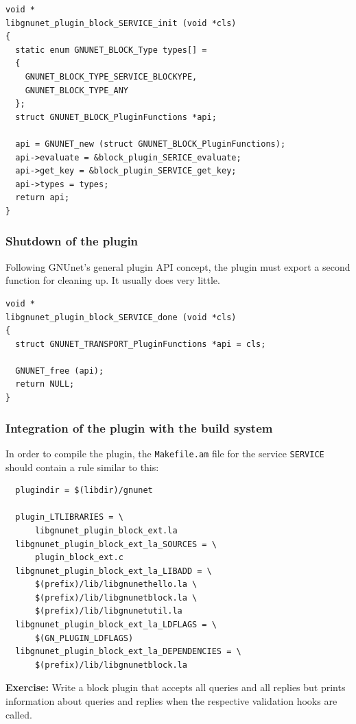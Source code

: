 \documentclass[10pt]{article}
\newcommand{\exercise}[1]{\noindent\begin{boxedminipage}{\textwidth}{\bf Exercise:} #1 \end{boxedminipage}}
\begin{document}
\lstset{language=C}
\begin{lstlisting}
void *
libgnunet_plugin_block_SERVICE_init (void *cls)
{
  static enum GNUNET_BLOCK_Type types[] =
  {
    GNUNET_BLOCK_TYPE_SERVICE_BLOCKYPE,
    GNUNET_BLOCK_TYPE_ANY
  };
  struct GNUNET_BLOCK_PluginFunctions *api;

  api = GNUNET_new (struct GNUNET_BLOCK_PluginFunctions);
  api->evaluate = &block_plugin_SERICE_evaluate;
  api->get_key = &block_plugin_SERVICE_get_key;
  api->types = types;
  return api;
}
\end{lstlisting}

\subsubsection{Shutdown of the plugin}

Following GNUnet's general plugin API concept, the plugin must
export a second function for cleaning up.  It usually does very
little.

\lstset{language=C}
\begin{lstlisting}
void *
libgnunet_plugin_block_SERVICE_done (void *cls)
{
  struct GNUNET_TRANSPORT_PluginFunctions *api = cls;

  GNUNET_free (api);
  return NULL;
}
\end{lstlisting}


\subsubsection{Integration of the plugin with the build system}

In order to compile the plugin, the {\tt Makefile.am} file for the
service \texttt{SERVICE} should contain a rule similar to this:

\lstset{language=make}
\begin{lstlisting}
  plugindir = $(libdir)/gnunet

  plugin_LTLIBRARIES = \
	  libgnunet_plugin_block_ext.la
  libgnunet_plugin_block_ext_la_SOURCES = \
	  plugin_block_ext.c
  libgnunet_plugin_block_ext_la_LIBADD = \
	  $(prefix)/lib/libgnunethello.la \
	  $(prefix)/lib/libgnunetblock.la \
	  $(prefix)/lib/libgnunetutil.la
  libgnunet_plugin_block_ext_la_LDFLAGS = \
	  $(GN_PLUGIN_LDFLAGS)
  libgnunet_plugin_block_ext_la_DEPENDENCIES = \
	  $(prefix)/lib/libgnunetblock.la
\end{lstlisting}


\exercise{Write a block plugin that accepts all queries
and all replies but prints information about queries and replies
when the respective validation hooks are called.}
\end{document}

